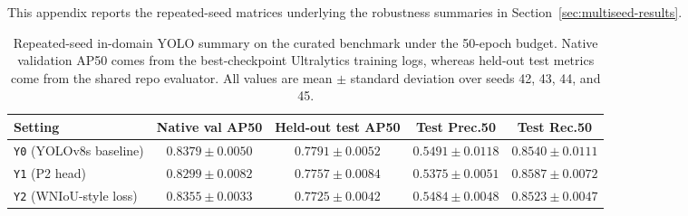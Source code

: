 \documentclass[cmc,article,submit,moreauthors,pdftex]{Definitions/tsp}
\begin{document}


\supplementary{}




This appendix reports the repeated-seed matrices underlying the robustness summaries in Section~\ref{sec:multiseed-results}.

\begin{table}[ht]
  \centering
  \caption{Repeated-seed in-domain YOLO summary on the curated benchmark under the 50-epoch budget. Native validation AP50 comes from the best-checkpoint Ultralytics training logs, whereas held-out test metrics come from the shared repo evaluator. All values are mean $\pm$ standard deviation over seeds 42, 43, 44, and 45.}
  \label{tab:app-curated-summary}
  \footnotesize
  \setlength{\tabcolsep}{4pt}
  \begin{tabularx}{\textwidth}{>{\raggedright\arraybackslash}p{} c c c c}
    \toprule
    Setting & Native val AP50 & Held-out test AP50 & Test Prec.50 & Test Rec.50 \\
    \midrule
    \texttt{Y0} (YOLOv8s baseline) & $0.8379 \pm 0.0050$ & $0.7791 \pm 0.0052$ & $0.5491 \pm 0.0118$ & $0.8540 \pm 0.0111$ \\
    \texttt{Y1} (P2 head) & $0.8299 \pm 0.0082$ & $0.7757 \pm 0.0084$ & $0.5375 \pm 0.0051$ & $0.8587 \pm 0.0072$ \\
    \texttt{Y2} (WNIoU-style loss) & $0.8355 \pm 0.0033$ & $0.7725 \pm 0.0042$ & $0.5484 \pm 0.0048$ & $0.8523 \pm 0.0047$ \\
    \bottomrule
  \end{tabularx}
\end{table}
\end{document}
